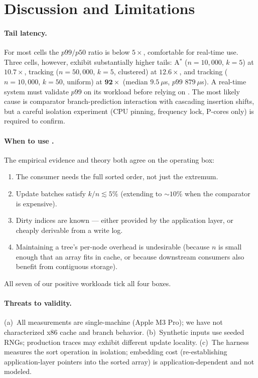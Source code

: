 \section{Discussion and Limitations}
\label{sec:disc}

\paragraph{Tail latency.}
For most cells the $p99/p50$ ratio is below $5\times$, comfortable for
real-time use. Three cells, however, exhibit substantially higher tails:
A$^*$ ($n{=}10{,}000$, $k{=}5$) at $10.7\times$, tracking
($n{=}50{,}000$, $k{=}5$, clustered) at $12.6\times$, and tracking
($n{=}10{,}000$, $k{=}50$, uniform) at $\mathbf{92\times}$ (median
$9.5~\mu$s, $p99$ $879~\mu$s). A real-time system must validate
$p99$ on its workload before relying on \DeltaSort. The most likely
cause is comparator branch-prediction interaction with cascading insertion
shifts, but a careful isolation experiment (CPU pinning, frequency lock,
P-cores only) is required to confirm.

\paragraph{When to use \DeltaSort.}
The empirical evidence and theory both agree on the operating box:
\begin{enumerate}
  \item The consumer needs the full sorted order, not just the extremum.
  \item Update batches satisfy $k/n \lesssim 5\%$
        (extending to ${\sim}10\%$ when the comparator is expensive).
  \item Dirty indices are known --- either provided by the application
        layer, or cheaply derivable from a write log.
  \item Maintaining a tree's per-node overhead is undesirable (because
        $n$ is small enough that an array fits in cache, or because
        downstream consumers also benefit from contiguous storage).
\end{enumerate}
All seven of our positive workloads tick all four boxes.

\paragraph{Threats to validity.}
(a)~All measurements are single-machine (Apple M3 Pro); we have not
characterized x86 cache and branch behavior. (b)~Synthetic inputs use
seeded RNGs; production traces may exhibit different update locality.
(c)~The harness measures the sort operation in isolation; embedding cost
(re-establishing application-layer pointers into the sorted array) is
application-dependent and not modeled.

